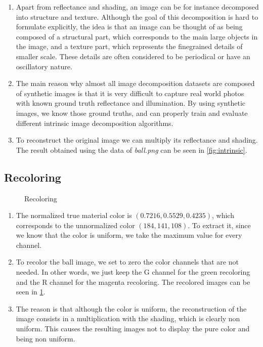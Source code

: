 \documentclass{article}
\begin{document}
\begin{enumerate}
	\item Apart from reflectance and shading, an image can be for instance decomposed into structure and texture. Although the goal of this decomposition is hard to formulate explicitly, the idea is that an image can be thought of as being composed of a structural part, which corresponds to the main large objects in the image, and a texture part, which represents the finegrained details of smaller scale. These details are often considered to be periodical or have an oscillatory nature.
	
	\item The main reason why almost all image decomposition datasets are composed of synthetic images is that it is very difficult  to capture real world photos with known ground truth reflectance and illumination. By using synthetic images, we know those ground truths, and can properly train and evaluate different intrinsic image decomposition algorithms.
	
	\item To reconstruct the original image  we can multiply its reflectance and shading. The result obtained using the data of \textit{ball.png} can be seen in \cref{fig:intrinsic}.
\end{enumerate}



\subsection{Recoloring}

\begin{figure}[h]
    \centering
    \caption{Recoloring}
    \label{fig:recolor}
\end{figure}

\begin{enumerate}
	\item The normalized true material color is $(0.7216, 0.5529, 0.4235)$, which corresponds to the unnormalized color $(184, 141, 108)$. To extract it, since we know that the color is uniform, we take the maximum value for every channel.
	
	\item To recolor the ball image, we set to zero the color channels that are not needed. In other words, we just keep the G channel for the green recoloring and the R channel for the magenta recoloring. The recolored images can be seen in \cref{fig:recolor}.
	
	\item The reason is that although the color is uniform, the reconstruction of the image consists in a multiplication with the shading, which is clearly non uniform. This causes the resulting images not to display the pure color and being non uniform.
\end{enumerate}
\end{document}
